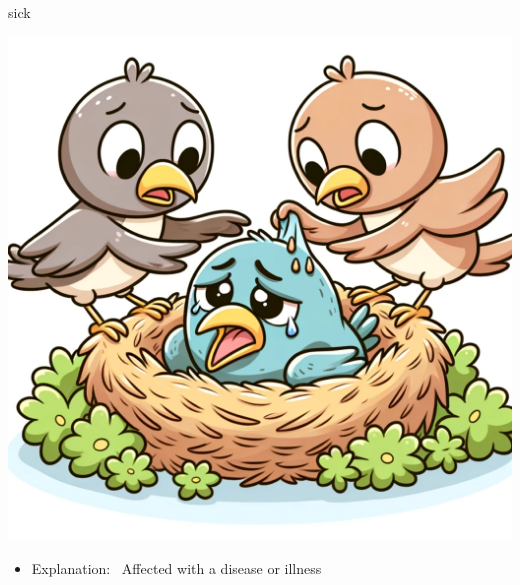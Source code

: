 \documentclass[avery5371, grid,frame]{flashcards}
\begin{document}
\renewcommand{\cardpaper}{a4paper}
\renewcommand{\cardpapermode}{landscape}
\renewcommand{\cardrows}{2}
\renewcommand{\cardcolumns}{2}
\setlength{\cardheight}{3.5in}
\setlength{\cardwidth}{5.0in}
\setlength{\topoffset}{0.50in}
\setlength{\oddoffset}{0.50in}
\setlength{\evenoffset}{0.50in}

\begin{flashcard}{sick}
    \vspace*{\fill}
    \begin{center}
        \begin{minipage}[c]{.45\textwidth}
            \includegraphics[width=\textwidth]{cards/s/sick/sick - a bird in a nest, looking weak and tired, with other birds bringing it food and care.png}
        \end{minipage}
        \begin{minipage}[c]{.45\textwidth}
            \begin{itemize}\setlength\itemsep{12pt}
            \item Explanation: \ Affected with a disease or illness


\end{itemize}
\end{minipage}
\end{center}
\end{flashcard}
\end{document}
